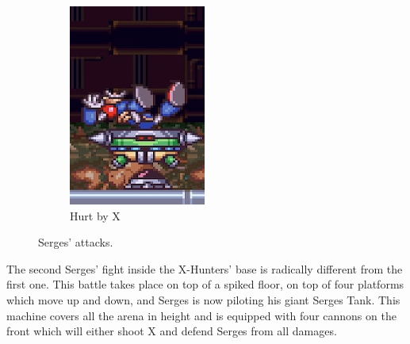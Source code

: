 \begin{figure}[htp]
\begin{minipage}{0.255\linewidth}
	\end{minipage}
	\begin{subfigure}{0.25\linewidth}
		\centering
		\includegraphics[width=\linewidth]{figures/X2/Hunter_stages/Serges_hurt.png}
		\caption{Hurt by X}
	\end{subfigure}
	\caption{Serges' attacks.}	
\end{figure}

The second Serges' fight inside the X-Hunters' base is radically different from the first one. This battle takes place on top of a spiked floor, on top of four platforms which move up and down, and Serges is now piloting his giant Serges Tank. This machine covers all the arena in height and is equipped with four cannons on the front which will either shoot X and defend Serges from all damages. 

